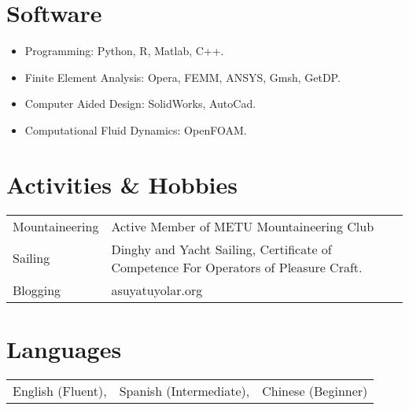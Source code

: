 \documentclass[a4paper,12pt]{article}
\begin{document}
\section{Software}
\begin{itemize}
\item Programming: Python, R, Matlab, C++.
\item Finite Element Analysis: Opera, FEMM, ANSYS, Gmsh, GetDP.
\item Computer Aided Design: SolidWorks, AutoCad.
\item Computational Fluid Dynamics: OpenFOAM.
\end{itemize}

\section{Activities \& Hobbies}
\begin{tabular}{ll}
Mountaineering & Active Member of METU Mountaineering Club\\
Sailing & Dinghy and Yacht Sailing, Certificate of Competence For Operators of Pleasure Craft. \\
Blogging & asuyatuyolar.org\\
\end{tabular}

\section{Languages}
\begin{tabular}{lll} 
English (Fluent), & Spanish (Intermediate), & Chinese (Beginner)
\end{tabular}
\end{document}
